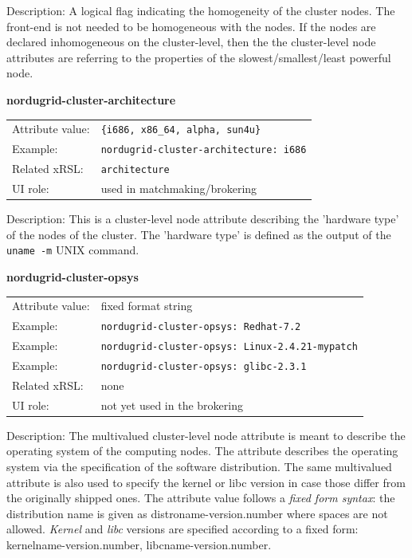 \documentclass{article}
\begin{document}
Description: A logical flag indicating the homogeneity of the cluster nodes. 
The front-end is not needed to be homogeneous with the nodes. If the nodes 
are declared inhomogeneous on the cluster-level, then the 
the cluster-level node attributes are referring to the properties of the 
slowest/smallest/least powerful node.


  \hspace*{0.5cm}
  \begin{shaded}
    \textbf{nordugrid-cluster-architecture}
  \end{shaded}
  \begin{tabular}{lp{10cm}}  
    Attribute value:& \verb#{i686, x86_64, alpha, sun4u}#\\
    Example:& \verb#nordugrid-cluster-architecture: i686#\\
    Related xRSL:& \verb#architecture#\\
    UI role:& used in matchmaking/brokering \\
  \end{tabular}

Description: This is a cluster-level node attribute describing the 'hardware type' of the
nodes of the cluster. The 'hardware type' is defined as the output of the \verb#uname -m# UNIX 
command. 


  \hspace*{0.5cm}
  \begin{shaded}
    \textbf{nordugrid-cluster-opsys}
  \end{shaded}
  \begin{tabular}{lp{10cm}}  
    Attribute value:& fixed format string\\
    Example:& \verb#nordugrid-cluster-opsys: Redhat-7.2#\\
    Example:& \verb#nordugrid-cluster-opsys: Linux-2.4.21-mypatch#\\   
    Example:& \verb#nordugrid-cluster-opsys: glibc-2.3.1#\\ 
    Related xRSL:& none\\
    UI role:& not yet used in the brokering\\
  \end{tabular}

Description: The multivalued cluster-level node attribute is meant to describe 
the operating system of the computing nodes. The attribute describes the
operating system via the specification of the software distribution.
The same multivalued attribute is also used to specify the kernel or libc version
in case those differ from the originally shipped ones. 
The attribute value follows a {\it fixed form syntax}:  the distribution name
is given as distroname-version.number where spaces are not allowed.
{\it Kernel} and {\it libc} versions are specified according to a 
fixed form: kernelname-version.number, libcname-version.number. 
\end{document}
